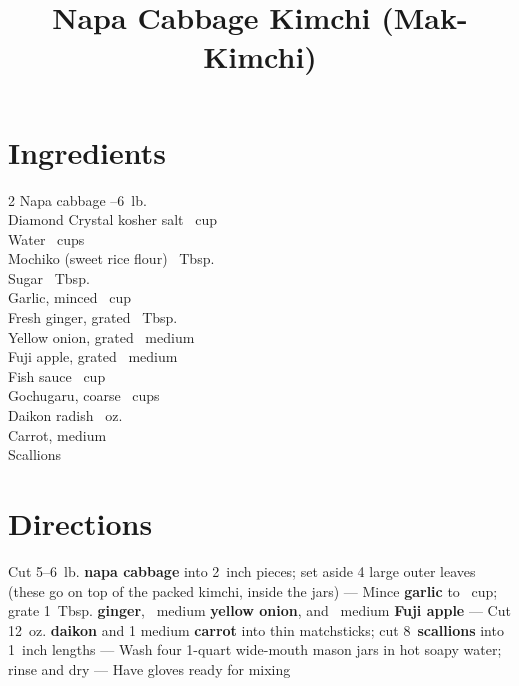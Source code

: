\documentclass[11pt,letterpaper]{article}
\title{Napa Cabbage Kimchi (Mak-Kimchi)}
\author{}
\date{}
\begin{document}
\maketitle
\thispagestyle{empty}
\section*{Ingredients}
\setlength{\columnsep}{20pt}
\begin{multicols}{2}
\noindent
    Napa cabbage --6~lb. \\
    Diamond Crystal kosher salt \dotfill {}~cup \\
    Water ~cups \\
    Mochiko (sweet rice flour) ~Tbsp. \\
    Sugar ~Tbsp. \\
    Garlic, minced \dotfill {}~cup \\
    \columnbreak
    Fresh ginger, grated ~Tbsp. \\
    Yellow onion, grated \dotfill {}~medium \\
    Fuji apple, grated \dotfill {}~medium \\
    Fish sauce \dotfill {}~cup \\
    Gochugaru, coarse ~cups \\
    Daikon radish ~oz. \\
    Carrot, medium  \\
    Scallions  \\
\end{multicols}

\section*{Directions}

\noindent
Cut 5--6~lb. \textbf{napa cabbage} into 2~inch pieces; set aside 4 large outer leaves (these go on top of the packed kimchi, inside the jars) ---
Mince \textbf{garlic} to ~cup; grate 1~Tbsp. \textbf{ginger}, ~medium \textbf{yellow onion}, and ~medium \textbf{Fuji apple} ---
Cut 12~oz. \textbf{daikon} and 1 medium \textbf{carrot} into thin matchsticks; cut 8~\textbf{scallions} into 1~inch lengths ---
Wash four 1-quart wide-mouth mason jars in hot soapy water; rinse and dry ---
Have gloves ready for mixing
\end{document}
